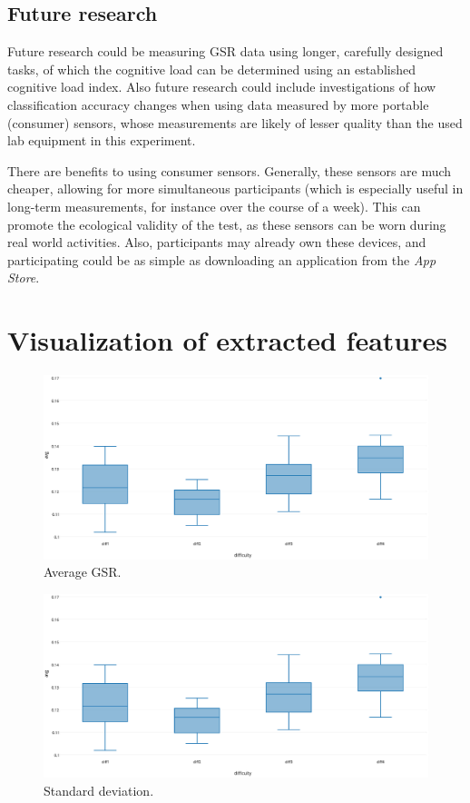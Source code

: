 \documentclass[11pt,leqno,a4paper]{report} %
\begin{document}
\section{Future research}
Future research could be measuring GSR data using longer, carefully designed tasks, of which the cognitive load can be determined using an established cognitive load index.
Also future research could include investigations of how classification accuracy changes when using data measured by more portable (consumer) sensors, whose measurements are likely of lesser quality than the used lab equipment in this experiment. 

There are benefits to using consumer sensors. Generally, these sensors are much cheaper, allowing for more simultaneous participants (which is especially useful in long-term measurements, for instance over the course of a week). This can promote the ecological validity of the test, as these sensors can be worn during real world activities. Also, participants may already own these devices, and participating could be as simple as downloading an application from the \emph{App Store}.
 

\appendix
\chapter{Visualization of extracted features}


\begin{figure}[H]
  \centering
 	\hspace*{-.3\textwidth}   
 	\includegraphics[width=1.6\textwidth]{avggsr.eps}
  \caption{Average GSR.}
\end{figure}

\begin{figure}[H]
  \centering
 	\hspace*{-.3\textwidth}   
 	\includegraphics[width=1.6\textwidth]{avggsr.eps}
  \caption{Standard deviation.}
\end{figure}
\end{document}
